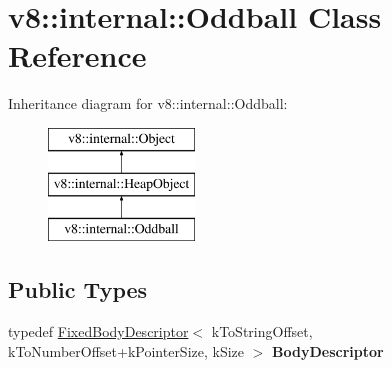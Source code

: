 \hypertarget{classv8_1_1internal_1_1_oddball}{}\section{v8\+:\+:internal\+:\+:Oddball Class Reference}
\label{classv8_1_1internal_1_1_oddball}
Inheritance diagram for v8\+:\+:internal\+:\+:Oddball\+:\begin{figure}[H]
\begin{center}
\leavevmode
\includegraphics[height=3.000000cm]{classv8_1_1internal_1_1_oddball}
\end{center}
\end{figure}
\subsection*{Public Types}
\begin{DoxyCompactItemize}
\item 
\hypertarget{classv8_1_1internal_1_1_oddball_ad1d459bb4618454b50c162aa60785ca0}{}typedef \hyperlink{classv8_1_1internal_1_1_fixed_body_descriptor}{Fixed\+Body\+Descriptor}$<$ k\+To\+String\+Offset, k\+To\+Number\+Offset+k\+Pointer\+Size, k\+Size $>$ {\bfseries Body\+Descriptor}\label{classv8_1_1internal_1_1_oddball_ad1d459bb4618454b50c162aa60785ca0}

\end{DoxyCompactItemize}
